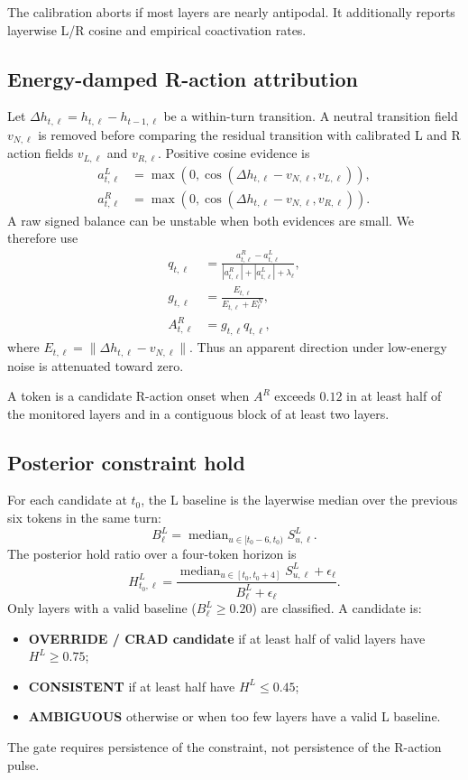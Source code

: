 \documentclass[10pt]{article}
\newcommand{\SL}{S^{L}}
\newcommand{\AR}{A^{R}}
\newcommand{\HL}{H^{L}}
\begin{document}
The calibration aborts if most layers are nearly antipodal. It additionally reports layerwise L/R cosine and empirical coactivation rates.

\subsection{Energy-damped R-action attribution}

Let $\Delta h_{t,\ell}=h_{t,\ell}-h_{t-1,\ell}$ be a within-turn transition. A neutral transition field $v_{N,\ell}$ is removed before comparing the residual transition with calibrated L and R action fields $v_{L,\ell}$ and $v_{R,\ell}$. Positive cosine evidence is
\begin{align}
a^L_{t,\ell} &= \max\left(0,\cos(\Delta h_{t,\ell}-v_{N,\ell},v_{L,\ell})\right),\\
a^R_{t,\ell} &= \max\left(0,\cos(\Delta h_{t,\ell}-v_{N,\ell},v_{R,\ell})\right).
\end{align}
A raw signed balance can be unstable when both evidences are small. We therefore use
\begin{align}
q_{t,\ell} &= \frac{a^R_{t,\ell}-a^L_{t,\ell}}{|a^R_{t,\ell}|+|a^L_{t,\ell}|+\lambda_\ell},\\
g_{t,\ell} &= \frac{E_{t,\ell}}{E_{t,\ell}+E^{N}_{\ell}},\\
\AR_{t,\ell} &= g_{t,\ell}q_{t,\ell},
\end{align}
where $E_{t,\ell}=\|\Delta h_{t,\ell}-v_{N,\ell}\|$. Thus an apparent direction under low-energy noise is attenuated toward zero.

A token is a candidate R-action onset when $\AR$ exceeds $0.12$ in at least half of the monitored layers and in a contiguous block of at least two layers.

\subsection{Posterior constraint hold}

For each candidate at $t_0$, the L baseline is the layerwise median over the previous six tokens in the same turn:
\begin{equation}
B^L_\ell = \operatorname{median}_{u\in[t_0-6,t_0)} \SL_{u,\ell}.
\end{equation}
The posterior hold ratio over a four-token horizon is
\begin{equation}
\HL_{t_0,\ell}=\frac{\operatorname{median}_{u\in[t_0,t_0+4]}\SL_{u,\ell}+\epsilon_\ell}{B^L_\ell+\epsilon_\ell}.
\end{equation}
Only layers with a valid baseline ($B^L_\ell\geq 0.20$) are classified. A candidate is:
\begin{itemize}
  \item \textbf{OVERRIDE / CRAD candidate} if at least half of valid layers have $\HL\geq0.75$;
  \item \textbf{CONSISTENT} if at least half have $\HL\leq0.45$;
  \item \textbf{AMBIGUOUS} otherwise or when too few layers have a valid L baseline.
\end{itemize}
The gate requires persistence of the constraint, not persistence of the R-action pulse.
\end{document}
